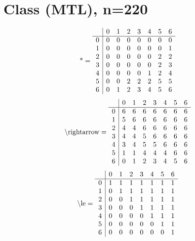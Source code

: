 \documentclass[11pt]{article}
\begin{document}
\section{Class (MTL), n=220}
\[\text{*} = 
\begin{array}{r | r r r r r r r}
 & 0 & 1 & 2 & 3 & 4 & 5 & 6 \\ \hline
0 & 0 & 0 & 0 & 0 & 0 & 0 & 0 \\
1 & 0 & 0 & 0 & 0 & 0 & 0 & 1 \\
2 & 0 & 0 & 0 & 0 & 0 & 2 & 2 \\
3 & 0 & 0 & 0 & 0 & 0 & 2 & 3 \\
4 & 0 & 0 & 0 & 0 & 1 & 2 & 4 \\
5 & 0 & 0 & 2 & 2 & 2 & 5 & 5 \\
6 & 0 & 1 & 2 & 3 & 4 & 5 & 6 \\
\end{array}
\]
\[\text{\textbackslash rightarrow} = 
\begin{array}{r | r r r r r r r}
 & 0 & 1 & 2 & 3 & 4 & 5 & 6 \\ \hline
0 & 6 & 6 & 6 & 6 & 6 & 6 & 6 \\
1 & 5 & 6 & 6 & 6 & 6 & 6 & 6 \\
2 & 4 & 4 & 6 & 6 & 6 & 6 & 6 \\
3 & 4 & 4 & 5 & 6 & 6 & 6 & 6 \\
4 & 3 & 4 & 5 & 5 & 6 & 6 & 6 \\
5 & 1 & 1 & 4 & 4 & 4 & 6 & 6 \\
6 & 0 & 1 & 2 & 3 & 4 & 5 & 6 \\
\end{array}
\]
\[\text{\textbackslash le} = 
\begin{array}{r | r r r r r r r}
 & 0 & 1 & 2 & 3 & 4 & 5 & 6 \\ \hline
0 & 1 & 1 & 1 & 1 & 1 & 1 & 1 \\
1 & 0 & 1 & 1 & 1 & 1 & 1 & 1 \\
2 & 0 & 0 & 1 & 1 & 1 & 1 & 1 \\
3 & 0 & 0 & 0 & 1 & 1 & 1 & 1 \\
4 & 0 & 0 & 0 & 0 & 1 & 1 & 1 \\
5 & 0 & 0 & 0 & 0 & 0 & 1 & 1 \\
6 & 0 & 0 & 0 & 0 & 0 & 0 & 1 \\
\end{array}
\]
\end{document}
